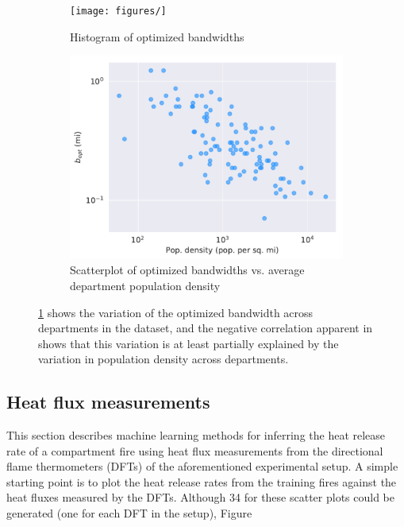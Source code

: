 \documentclass{article}
\begin{document}
\begin{figure}[htbp]
  \centering
  \begin{subfigure}[t]{.45\textwidth}
      \centering
      \texttt{[image: figures/]}
      \caption{Histogram of optimized bandwidths}
      \label{fig:bhist}
  \end{subfigure}
  \begin{subfigure}[t]{.45\textwidth}
      \centering
      \includegraphics[width=\textwidth ,keepaspectratio]{figures/boptvspopdensity.pdf}
      \caption{Scatterplot of optimized bandwidths vs. average department population density}
      \label{fig:popband}
  \end{subfigure}
  \caption{\protect\ref{fig:bhist} shows the variation of the optimized bandwidth across departments in the dataset, and the negative correlation apparent in \protect{} shows that this variation is at least partially explained by the variation in population density across departments.}
  \label{fig:band_optimization}
\end{figure}





\subsection{Heat flux measurements}
This section describes machine learning methods for inferring the heat release rate of a compartment fire using heat flux measurements from the directional flame thermometers (DFTs) of the aforementioned experimental setup. A simple starting point is to plot the heat release rates from the training fires against the heat fluxes measured by the DFTs. Although 34 for these scatter plots could be generated (one for each DFT in the setup), Figure 
\end{document}
